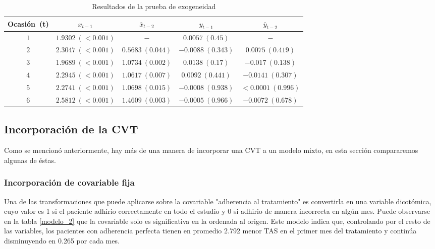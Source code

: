 \documentclass[spanish]{article}
\numberwithin{figure}{subsection}
\numberwithin{equation}{subsection}
\numberwithin{table}{subsection}
\begin{document}
\begin{table}[H]
	\centering
	\label{exog_table}
	\caption{Resultados de la prueba de exogeneidad}
	\begin{tabular}{*{5}{|c}|}
		\hline
		Ocasión\ (t) & $x_{t-1}$ & $\overline{x}_{t-2}$ & $y_{t-1}$ &
		$\overline{y}_{t-2}$ \\
		\hline
		\hline
		$1$ & $1.9302\ (<0.001)$ & $-$ & $0.0057\ (0.45)$ & $-$ \\
		$2$ & $2.3047\ (<0.001)$ & $0.5683\ (0.044)$ & $-0.0088\ (0.343)$ &
		$0.0075\ (0.419)$ \\
		$3$ & $1.9689\ (<0.001)$ & $1.0734\ (0.002)$ & $0.0138\ (0.17)$ &
		$-0.017\ (0.138)$ \\
		$4$ & $2.2945\ (<0.001)$ & $1.0617\ (0.007)$ & $0.0092\ (0.441)$ &
		$-0.0141\ (0.307)$ \\
		$5$ & $2.2741\ (<0.001)$ & $1.0698\ (0.015)$ & $-0.0008\ (0.938)$ &
		$<0.0001\ (0.996)$ \\
		$6$ & $2.5812\ (<0.001)$ & $1.4609\ (0.003)$ & $-0.0005\ (0.966)$ &
		$-0.0072\ (0.678)$ \\
		\hline
	\end{tabular}
\end{table}

\subsection{Incorporación de la CVT}

Como se mencionó anteriormente, hay más de una manera de incorporar una CVT a un
modelo mixto, en esta sección compararemos algunas de éstas.

\subsubsection{Incorporación de covariable fija}

Una de las transformaciones que puede aplicarse sobre la covariable "adherencia
al tratamiento" es convertirla en una variable dicotómica, cuyo valor es 1 si el
paciente adhirio correctamente en todo el estudio y 0 si adhirio de manera
incorrecta en algún mes. Puede observarse en la tabla \ref{modelo_2} que la
covariable solo es significativa en la ordenada al origen. Este modelo indica
que, controlando por el resto de las variables, los pacientes con adherencia
perfecta tienen en promedio 2.792 menor TAS en el primer mes del tratamiento y
continúa disminuyendo en 0.265 por cada mes.
\end{document}
